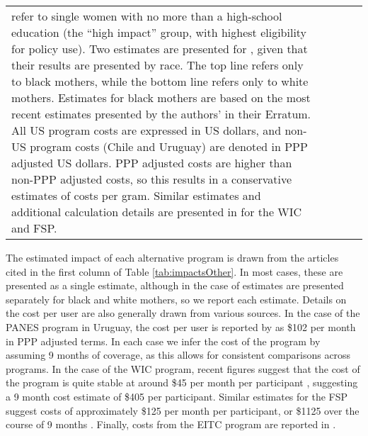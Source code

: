 \documentclass[12pt]{article}
\begin{document}
\begin{spacing}{1.4}
\begin{table}
\begin{tabular}{lcccc}
{{        \citet{Hoynesetal2015} refer to single women with no more than a
        high-school education (the ``high impact'' group, with highest
        eligibility for policy use). Two estimates are presented for
        \citet{Almondetal2011}, given that their results are presented by
        race.  The top line refers only to black mothers, while the bottom
        line refers only to white mothers.  Estimates for black mothers are
        based on the most recent estimates presented by the authors' in their
        Erratum.  All US program costs are expressed in US dollars, and
        non-US program costs (Chile and Uruguay) are denoted in PPP adjusted
        US dollars.  PPP adjusted costs are higher than non-PPP adjusted
        costs, so this results in a conservative estimates of costs per gram.
        Similar estimates and additional calculation details are presented in
        \citet{Clarkeetal2017} for the WIC and FSP.}}\\%
  \end{tabular}
\end{table}



The estimated impact of each alternative program is drawn from the articles
cited in the first column of Table \ref{tab:impactsOther}.  In most cases,
these are presented as a single estimate, although in the case of
\citet{Almondetal2011} estimates are presented separately for black and
white mothers, so we report each estimate.  Details on the cost per user
are also generally drawn from various sources.  In the case of the PANES
program in Uruguay, the cost per user is reported by
\citet{Amaranteetal2016} as \$102 per month in PPP adjusted terms.  In each
case we infer the cost of the program by assuming 9 months of coverage, as
this allows for consistent comparisons across programs.  In the case of the
WIC program, recent figures suggest that the cost of the program is quite
stable at around \$45 per month per participant \citep{WIC2017}, suggesting
a 9 month cost estimate of \$405 per participant.  Similar estimates for
the FSP suggest costs of approximately \$125 per month per participant, or
\$1125 over the course of 9 months \citep{FSP2017}. Finally, costs from the
EITC program are reported in \citet[Appendix Table A1]{Hoynesetal2015}.


\end{spacing}
\end{document}
